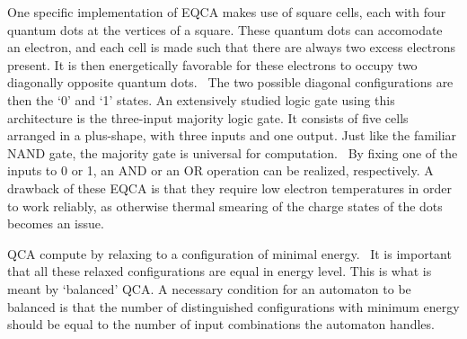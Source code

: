 \documentclass[11pt,a4paper,english]{article}
\begin{document}
One specific implementation of EQCA makes use of square cells, each with four quantum dots at the vertices of a square. These quantum dots can accomodate an electron, and each cell is made such that there are always two excess electrons present. It is then energetically favorable for these electrons to occupy two diagonally opposite quantum dots.~\cite{QCA_DigitalLogicGate} The two possible diagonal configurations are then the `0' and `1' states. An extensively studied logic gate using this architecture is the three-input majority logic gate. It consists of five cells arranged in a plus-shape, with three inputs and one output. Just like the familiar NAND gate, the majority gate is universal for computation.~\cite{NML_Carlton} By fixing one of the inputs to 0 or 1, an AND or an OR operation can be realized, respectively. A drawback of these EQCA is that they require low electron temperatures in order to work reliably, as otherwise thermal smearing of the charge states of the dots becomes an issue.~\cite{QCA_DigitalLogicGate} \par
QCA compute by relaxing to a configuration of minimal energy.~\cite{QCA_Algorithms} It is important that all these relaxed configurations are equal in energy level. This is what is meant by `balanced' QCA. A necessary condition for an automaton to be balanced is that the number of distinguished configurations with minimum energy should be equal to the number of input combinations the automaton handles.~\cite{QCA_Algorithms}
\end{document}
